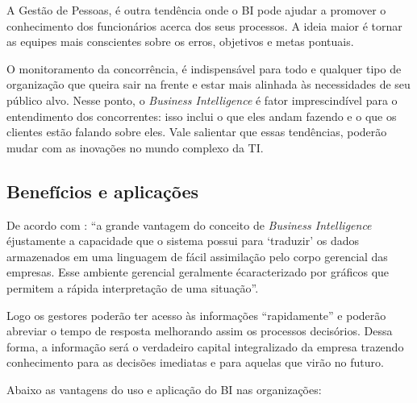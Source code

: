 A Gest\~{a}o de Pessoas, \'{e} outra tend\^{e}ncia onde o BI pode ajudar a promover o conhecimento dos funcion\'{a}rios acerca dos seus processos. A ideia maior \'{e} tornar as equipes mais conscientes sobre os erros, objetivos e metas pontuais.

O monitoramento da concorr\^{e}ncia, \'{e} indispens\'{a}vel para todo e qualquer tipo de organiza\c{c}\~{a}o que queira sair na frente e estar mais alinhada \`{a}s necessidades de seu  público alvo. Nesse ponto, o \textit{Business Intelligence} \'{e} fator imprescind\'{i}vel para o entendimento dos concorrentes: isso inclui o que eles andam fazendo e o que os clientes est\~{a}o falando sobre eles.
Vale salientar que essas tend\^{e}ncias, poder\~{a}o mudar com as inova\c{c}\~{o}es no mundo complexo da TI.

\subsection{Benef\'{i}cios e aplica\c{c}\~{o}es}

De acordo com \cite{noronha-2013} : “a grande vantagem do conceito de \textit{Business Intelligence} \'{e}justamente a capacidade que o sistema possui para ‘traduzir’ os dados armazenados em uma linguagem de f\'{a}cil assimila\c{c}\~{a}o pelo corpo gerencial das empresas. Esse ambiente gerencial geralmente \'{e}caracterizado por gr\'{a}ficos que permitem a r\'{a}pida interpreta\c{c}\~{a}o de uma situa\c{c}\~{a}o”.

Logo os gestores poder\~{a}o ter acesso \`{a}s informa\c{c}\~{o}es “rapidamente” e poder\~{a}o abreviar o tempo de resposta melhorando assim os processos decis\'{o}rios. Dessa forma, a informa\c{c}\~{a}o ser\'{a} o verdadeiro capital integralizado da empresa trazendo conhecimento para as decis\~{o}es imediatas e para aquelas que vir\~{a}o no futuro.

Abaixo as vantagens do uso e aplica\c{c}\~{a}o do BI nas organiza\c{c}\~{o}es:

